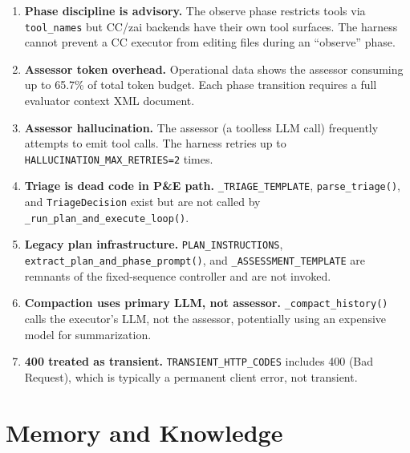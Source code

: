 \documentclass[11pt,letterpaper]{report}
\newcommand{\code}[1]{\texttt{#1}}
\begin{document}
\begin{enumerate}
  \item \textbf{Phase discipline is advisory.}
    The observe phase restricts tools via \code{tool\_names} but CC/zai
    backends have their own tool surfaces. The harness cannot prevent a
    CC executor from editing files during an ``observe'' phase.

  \item \textbf{Assessor token overhead.}
    Operational data shows the assessor consuming up to 65.7\% of total
    token budget. Each phase transition requires a full evaluator context
    XML document.

  \item \textbf{Assessor hallucination.}
    The assessor (a toolless LLM call) frequently attempts to emit tool
    calls. The harness retries up to \code{HALLUCINATION\_MAX\_RETRIES=2}
    times.

  \item \textbf{Triage is dead code in P\&E path.}
    \code{\_TRIAGE\_TEMPLATE}, \code{parse\_triage()}, and
    \code{TriageDecision} exist but are not called by
    \code{\_run\_plan\_and\_execute\_loop()}.

  \item \textbf{Legacy plan infrastructure.}
    \code{PLAN\_INSTRUCTIONS}, \code{extract\_plan\_and\_phase\_prompt()},
    and \code{\_ASSESSMENT\_TEMPLATE}
    are remnants of the fixed-sequence controller and are not invoked.

  \item \textbf{Compaction uses primary LLM, not assessor.}
    \code{\_compact\_history()} calls the executor's LLM, not the
    assessor, potentially using an expensive model for summarization.

  \item \textbf{400 treated as transient.}
    \code{TRANSIENT\_HTTP\_CODES} includes 400 (Bad Request),
    which is typically a permanent client error, not transient.
\end{enumerate}


\part{Memory and Knowledge}
\label{part:memory}
\end{document}
